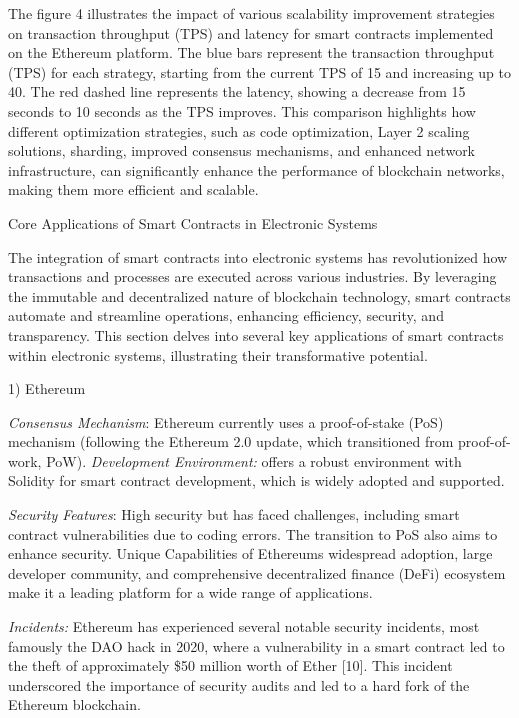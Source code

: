 \begin{multicols}{2}
The figure 4 illustrates the impact of various scalability improvement
strategies on transaction throughput (TPS) and latency for smart
contracts implemented on the Ethereum platform. The blue bars represent
the transaction throughput (TPS) for each strategy, starting from the
current TPS of 15 and increasing up to 40. The red dashed line
represents the latency, showing a decrease from 15 seconds to 10 seconds
as the TPS improves. This comparison highlights how different
optimization strategies, such as code optimization, Layer 2 scaling
solutions, sharding, improved consensus mechanisms, and enhanced network
infrastructure, can significantly enhance the performance of blockchain
networks, making them more efficient and scalable.

Core Applications of Smart Contracts in Electronic Systems

The integration of smart contracts into electronic systems has
revolutionized how transactions and processes are executed across
various industries. By leveraging the immutable and decentralized nature
of blockchain technology, smart contracts automate and streamline
operations, enhancing efficiency, security, and transparency. This
section delves into several key applications of smart contracts within
electronic systems, illustrating their transformative potential.

1) Ethereum

\emph{Consensus Mechanism}: Ethereum currently uses a proof-of-stake
(PoS) mechanism (following the Ethereum 2.0 update, which transitioned
from proof-of-work, PoW). \emph{Development Environment:} offers a
robust environment with Solidity for smart contract development, which
is widely adopted and supported.

\emph{Security Features}: High security but has faced challenges,
including smart contract vulnerabilities due to coding errors. The
transition to PoS also aims to enhance security. Unique Capabilities of
Ethereum\textquotesingle s widespread adoption, large developer
community, and comprehensive decentralized finance (DeFi) ecosystem make
it a leading platform for a wide range of applications.

\emph{Incidents:} Ethereum has experienced several notable security
incidents, most famously the DAO hack in 2020, where a vulnerability in
a smart contract led to the theft of approximately \$50 million worth of
Ether {[}10{]}. This incident underscored the importance of security
audits and led to a hard fork of the Ethereum blockchain.


\end{multicols}
